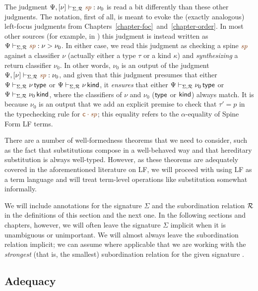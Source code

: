 The judgment $\Psi, [\nu] \vdash_{\Sigma,\subord} \lf\spi : \nu_0$ is
read a bit differently than these other judgments. The notation, first
of all, is meant to evoke the (exactly analogous) left-focus judgments
from Chapters~\ref{chapter-foc}~and~\ref{chapter-order}. 
In most other sources (for example, in
\cite{cervesato02linear}) this judgment is instead written as $\Psi
\vdash_{\Sigma,\subord} \lf\spi : \nu > \nu_0$. In either case, we
read this judgment as checking a spine $\lf\spi$ against a classifier
$\nu$ (actually either a type $\tau$ or a kind $\kappa$) and {\it
  synthesizing} a return classifier $\nu_0$. In other words, $\nu_0$
is an output of the judgment $\Psi, [\nu] \vdash_{\Sigma,\subord}
\lf\spi : \nu_0$, and given that this judgment presumes that either
$\Psi \vdash_{\Sigma,\mathcal R} \nu\,{\sf type}$ or $\Psi
\vdash_{\Sigma,\mathcal R} \nu\,{\sf kind}$, it {\it ensures} that either
$\Psi \vdash_{\Sigma,\mathcal R} \nu_0\,{\sf type}$ or $\Psi
\vdash_{\Sigma,\mathcal R} \nu_0\,{\sf kind}$, where the classifiers of
$\nu$ and $\nu_0$ (${\sf type}$ or ${\sf kind}$) always match.  It is
because $\nu_0$ is an output that we add an explicit premise to check
that $\tau' = p$ in the typechecking rule for $\lf{\lfroot{\sf
    c}{\spi}}$; this equality refers to the $\alpha$-equality of Spine
Form LF terms.

There are a number of well-formedness theorems that we need to
consider, such as the fact that substitutions compose in a
well-behaved way and that hereditary substitution is always
well-typed.  However, as these theorems are adequately covered in the
aforementioned literature on LF, we will proceed with using LF as a
term language and will treat term-level operations like substitution
somewhat informally.

We will include annotations for the signature $\Sigma$ and the
subordination relation $\mathcal R$ in the definitions of this section
and the next one. In the following sections and chapters, however, we
will often leave the signature $\Sigma$ implicit when it is
unambiguous or unimportant. We will almost always leave the
subordination relation implicit; we can assume where applicable that
we are working with the {\it strongest} (that is, the smallest)
subordination relation for the given signature
\cite{harper07mechanizing}.

\subsection{Adequacy}
\label{sec:lf-adequacy}

